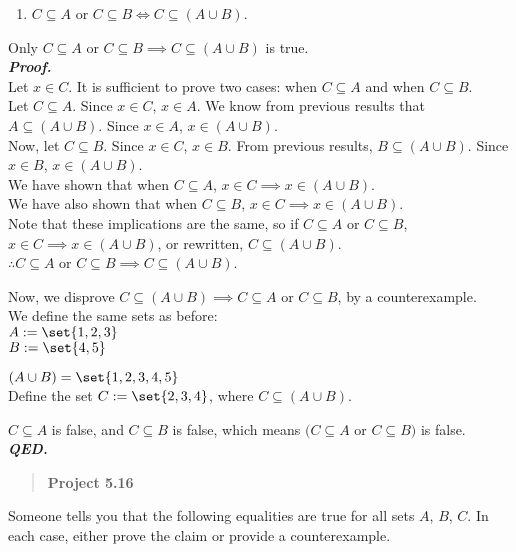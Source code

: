 \begin{enumerate}
\def\labelenumi{(\roman{enumi})}
\setcounter{enumi}{1}
\tightlist
\item
  \(C \subseteq A\) or \(C \subseteq B \iff C \subseteq (A \cup B)\).
\end{enumerate}

Only \(C \subseteq A\) or
\(C \subseteq B \implies C \subseteq (A \cup B)\) is true.\\
\textbf{\emph{Proof.}}\\
Let \(x\in C\). It is sufficient to prove two cases: when
\(C\subseteq A\) and when \(C\subseteq B\).\\
Let \(C\subseteq A\). Since \(x\in C\), \(x\in A\). We know from
previous results that \(A\subseteq (A\cup B)\). Since \(x\in A\),
\(x\in (A\cup B)\).\\
Now, let \(C\subseteq B\). Since \(x\in C\), \(x\in B\). From previous
results, \(B\subseteq (A\cup B)\). Since \(x\in B\),
\(x\in (A\cup B)\).\\
We have shown that when \(C\subseteq A\),
\(x\in C \implies x\in (A\cup B)\).\\
We have also shown that when \(C\subseteq B\),
\(x\in C \implies x\in (A\cup B)\).\\
Note that these implications are the same, so if \(C\subseteq A\) or
\(C\subseteq B\), \(x\in C \implies x\in (A\cup B)\), or rewritten,
\(C\subseteq (A\cup B)\).\\
\(\therefore C \subseteq A\) or
\(C \subseteq B \implies C \subseteq (A \cup B)\).

Now, we disprove \(C \subseteq (A \cup B) \implies C \subseteq A\) or
\(C \subseteq B\), by a counterexample.\\
We define the same sets as before:\\
\(A:=\set{1,2,3}\)\\
\(B:=\set{4,5}\)

\((A\cup B) = \set{1,2,3,4,5}\)\\
Define the set \(C:=\set{2,3,4}\), where \(C\subseteq (A\cup B)\).

\(C\subseteq A\) is false, and \(C\subseteq B\) is false, which means
\((C\subseteq A\) or \(C\subseteq B)\) is false.\\
\textbf{\emph{QED.}}

\begin{quote}
\textbf{Project 5.16}
\end{quote}

Someone tells you that the following equalities are true for all sets
\(A\), \(B\), \(C\). In each case, either prove the claim or provide a
counterexample.

